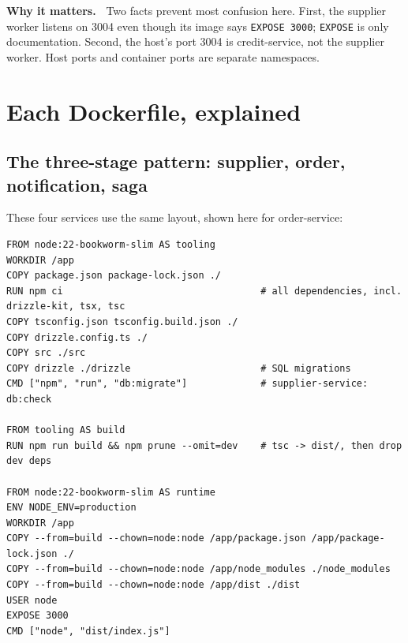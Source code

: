 \documentclass[11pt,a4paper]{article}
\newcommand{\code}[1]{\nolinkurl{#1}}
\newenvironment{why}{%
  \def\FrameCommand{{\color{accent}\vrule width 2.5pt}\hspace{8pt}}%
  \MakeFramed{\advance\hsize-\width\FrameRestore}\noindent\textbf{Why it matters.\ }}%
  {\endMakeFramed}
\begin{document}
\begin{why}
Two facts prevent most confusion here. First, the supplier worker listens on 3004 even
though its image says \code{EXPOSE 3000}; \code{EXPOSE} is only documentation. Second,
the host's port 3004 is credit-service, not the supplier worker. Host ports and container
ports are separate namespaces.
\end{why}

\section{Each Dockerfile, explained}
\label{sec:dockerfiles}

\subsection{The three-stage pattern: supplier, order, notification, saga}

These four services use the same layout, shown here for order-service:

\par\noindent\begin{minipage}{\linewidth}
\begin{lstlisting}[language=docker]
FROM node:22-bookworm-slim AS tooling
WORKDIR /app
COPY package.json package-lock.json ./
RUN npm ci                                   # all dependencies, incl. drizzle-kit, tsx, tsc
COPY tsconfig.json tsconfig.build.json ./
COPY drizzle.config.ts ./
COPY src ./src
COPY drizzle ./drizzle                       # SQL migrations
CMD ["npm", "run", "db:migrate"]             # supplier-service: db:check

FROM tooling AS build
RUN npm run build && npm prune --omit=dev    # tsc -> dist/, then drop dev deps

FROM node:22-bookworm-slim AS runtime
ENV NODE_ENV=production
WORKDIR /app
COPY --from=build --chown=node:node /app/package.json /app/package-lock.json ./
COPY --from=build --chown=node:node /app/node_modules ./node_modules
COPY --from=build --chown=node:node /app/dist ./dist
USER node
EXPOSE 3000
CMD ["node", "dist/index.js"]
\end{lstlisting}
\end{minipage}\par
\end{document}
